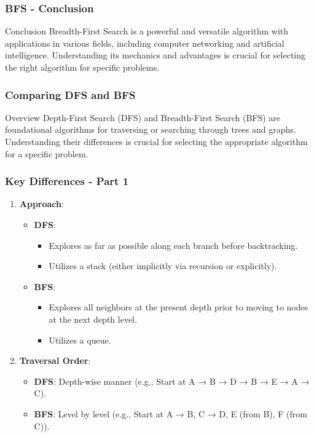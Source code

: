 \documentclass[aspectratio=169]{beamer}
\begin{document}
\begin{frame}[fragile]
    \frametitle{BFS - Conclusion}
    \begin{block}{Conclusion}
        Breadth-First Search is a powerful and versatile algorithm with applications in various fields, including computer networking and artificial intelligence. Understanding its mechanics and advantages is crucial for selecting the right algorithm for specific problems.
    \end{block}
\end{frame}

\begin{frame}
    \frametitle{Comparing DFS and BFS}
    \begin{block}{Overview}
        Depth-First Search (DFS) and Breadth-First Search (BFS) are foundational algorithms for traversing or searching through trees and graphs.
        Understanding their differences is crucial for selecting the appropriate algorithm for a specific problem.
    \end{block}
\end{frame}

\begin{frame}
    \frametitle{Key Differences - Part 1}
    \begin{enumerate}
        \item \textbf{Approach}:
        \begin{itemize}
            \item \textbf{DFS}:
            \begin{itemize}
                \item Explores as far as possible along each branch before backtracking.
                \item Utilizes a stack (either implicitly via recursion or explicitly).
            \end{itemize}
            \item \textbf{BFS}:
            \begin{itemize}
                \item Explores all neighbors at the present depth prior to moving to nodes at the next depth level.
                \item Utilizes a queue.
            \end{itemize}
        \end{itemize}
        
        \item \textbf{Traversal Order}:
        \begin{itemize}
            \item \textbf{DFS}: Depth-wise manner (e.g., Start at A → B → D → B → E → A → C).
            \item \textbf{BFS}: Level by level (e.g., Start at A → B, C → D, E (from B), F (from C)).
        \end{itemize}
    \end{enumerate}
\end{frame}
\end{document}
